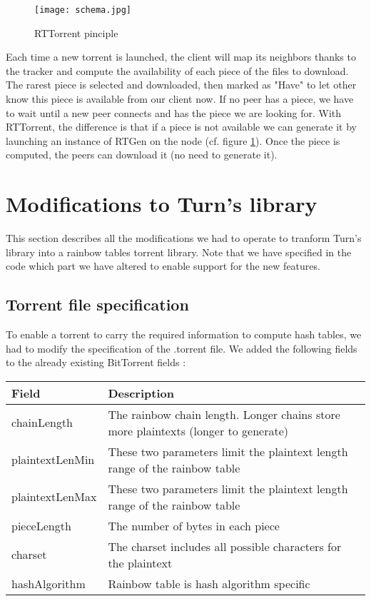 \documentclass[a4paper]{article}
\begin{document}
{\begin{figure}[H]
  \centering
    \texttt{[image: schema.jpg]}
    \caption{RTTorrent pinciple}
    \label{principle}
\end{figure}
\vspace{2mm}

Each time a new torrent is launched, the client will map its neighbors thanks to the tracker and compute the availability of each piece of the files to download. The rarest piece is selected and downloaded, then marked as "Have" to let other know this piece is available from our client now. If no peer has a piece, we have to wait until a new peer connects and has the piece we are looking for. With RTTorrent, the difference is that if a piece is not available we can generate it by launching an instance of RTGen on the node (cf. figure \ref{principle}). Once the piece is computed, the peers can download it (no need to generate it).

\section{Modifications to Turn's library}

This section describes all the modifications we had to operate to tranform Turn's library into a rainbow tables torrent library. Note that we have specified in the code which part we have altered to enable support for the new features.

\subsection{Torrent file specification}

To enable a torrent to carry the required information to compute hash tables, we had to modify the specification 
of the .torrent file. We added the following fields to the already existing BitTorrent fields :

\begin{center}
\begin{tabular}{|l|l|}
\hline 
\textbf{Field} & \textbf{Description} \\ 
\hline 
chainLength & The rainbow chain length. Longer chains store more plaintexts (longer to generate)\\ 
\hline 
plaintextLenMin & These two parameters limit the plaintext length range of the rainbow table\\ 
\hline 
plaintextLenMax & These two parameters limit the plaintext length range of the rainbow table\\ 
\hline 
pieceLength & The number of bytes in each piece\\ 
\hline 
charset & The charset includes all possible characters for the plaintext\\ 
\hline 
hashAlgorithm & Rainbow table is hash algorithm specific\\
\hline 
\end{tabular} 
\end{center}
\vspace{3mm}

}
\end{document}

